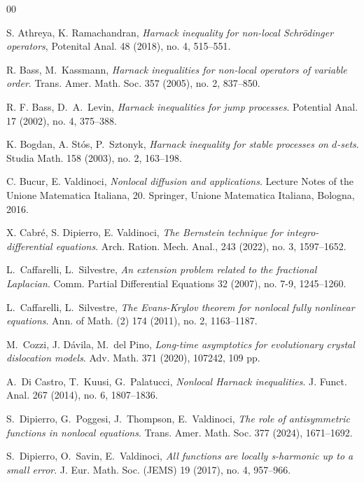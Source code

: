 \documentclass[a4paper,12pt,reqno]{amsart}
\numberwithin{equation}{section}
\theoremstyle{definition}
\theoremstyle{notation}
\begin{document}
\begin{thebibliography}{00}


S. Athreya, K. Ramachandran, \emph{Harnack inequality for non-local {S}chr\"odinger operators}, 
Potenital Anal. 48 (2018), no. 4, 515--551.


R. Bass, M.~Kassmann, \emph{Harnack inequalities for non-local operators of variable order}.
Trans. Amer. Math. Soc. 357 (2005), no. 2, 837--850.


R. F. Bass, D.~A.~Levin, \emph{Harnack inequalities for jump processes}.
Potential Anal. 17 (2002), no. 4, 375--388.


K. Bogdan, A. St\'os, P.~Sztonyk, \emph{Harnack inequality for stable processes on $d$-sets}.
Studia Math. 158 (2003), no. 2, 163--198.


C. Bucur, E. Valdinoci, \emph{Nonlocal diffusion and applications}. Lecture Notes of the Unione Matematica Italiana, 20. Springer, Unione Matematica Italiana, Bologna, 2016.


X. Cabr\'e, S. Dipierro, E. Valdinoci,
\emph{The Bernstein technique for integro-differential equations}.
Arch. Ration. Mech. Anal., 243 (2022), no. 3, 1597--1652.


L.~Caffarelli, L.~Silvestre, \emph{An extension problem related to the fractional Laplacian}. Comm. Partial Differential Equations 32 (2007), no. 7-9, 1245--1260. 


L.~Caffarelli, L.~Silvestre, \emph{The Evans-Krylov theorem for nonlocal fully nonlinear equations}. Ann. of Math. (2) 174 (2011), no. 2, 1163--1187.




M.~Cozzi, J. D\'avila, M.~del Pino, \emph{Long-time asymptotics for evolutionary crystal dislocation models}.
Adv. Math. 371 (2020), 107242, 109 pp.


A.~Di Castro, T.~Kuusi, G.~Palatucci, \emph{Nonlocal Harnack inequalities}.
J. Funct. Anal. 267 (2014), no. 6, 1807--1836.


S.~Dipierro, G.~Poggesi, J.~Thompson, E.~Valdinoci, \emph{The role of antisymmetric functions in nonlocal equations}.
Trans. Amer. Math. Soc. 377 (2024), 1671--1692.


S.~Dipierro, O.~Savin, E.~Valdinoci,
\emph{All functions are locally s-harmonic up to a small error}. J. Eur. Math. Soc. (JEMS) 19 (2017), no. 4, 957--966.



\end{thebibliography}
\end{document}
